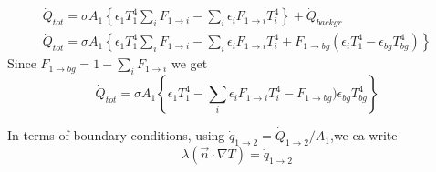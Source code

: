 \begin{align}
	\dot{Q}_{tot} = \sigma A_1 \left\{\epsilon_1 T_1^4 \sum_i F_{1 \rightarrow i} - \sum_i \epsilon_i F_{1 \rightarrow i}  T_i^4 \right\} + \dot{Q}_{backgr}\\
	\dot{Q}_{tot} = \sigma A_1 \left\{\epsilon_1 T_1^4 \sum_i F_{1 \rightarrow i} - \sum_i \epsilon_i F_{1 \rightarrow i}  T_i^4  +  F_{1 \rightarrow bg} (\epsilon_i T_1^4 - \epsilon_{bg} T_{bg}^4) \right\}
\end{align}
Since $F_{1 \rightarrow bg} = 1 - \sum_i F_{1 \rightarrow i} $ we get
\begin{equation}
	\dot{Q}_{tot} = \sigma A_1 \left\{\epsilon_1 T_1^4  - \sum_i \epsilon_i F_{1 \rightarrow i}  T_i^4  - F_{1 \rightarrow bg} ) \epsilon_{bg} T_{bg}^4 \right\}
\end{equation}

In terms of boundary conditions, using $\dot{q}_{1 \rightarrow 2} = \dot{Q}_{1 \rightarrow 2} / A_1$,we ca write
\begin{equation}
	\lambda \left(\vec{n} \cdot \nabla T \right) = \dot{q}_{1 \rightarrow 2}
\end{equation}